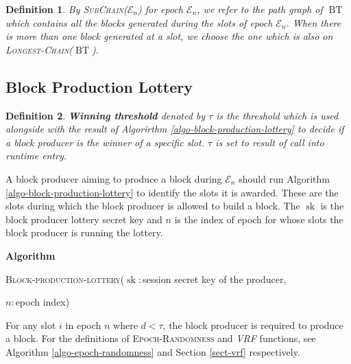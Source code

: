 \documentclass{book}
\newcommand{\tmem}[1]{{\em #1\/}}
\newcommand{\tmname}[1]{\textsc{#1}}
\newcommand{\tmop}[1]{\ensuremath{\operatorname{#1}}}
\newcommand{\tmstrong}[1]{\textbf{#1}}
\newcommand{\tmtextbf}[1]{{\bfseries{#1}}}
\newcommand{\tmtextup}[1]{{\upshape{#1}}}
\newenvironment{tmindent}{\begin{tmparmod}{1.5em}{0pt}{0pt}}{\end{tmparmod}}
\newenvironment{tmparmod}[3]{\begin{list}{}{\setlength{\topsep}{0pt}\setlength{\leftmargin}{#1}\setlength{\rightmargin}{#2}\setlength{\parindent}{#3}\setlength{\listparindent}{\parindent}\setlength{\itemindent}{\parindent}\setlength{\parsep}{\parskip}} \item[]}{\end{list}}
\newcounter{tmcounter}
\newcommand{\custombinding}[1]{%
  \setcounter{tmcounter}{#1}%
  \addtocounter{tmcounter}{-1}%
  \refstepcounter{tmcounter}}
\newtheorem{definition}{Definition}
\newtheorem{definition}{Definition}
\begin{document}
\begin{definition}
  \label{defn-epoch-subchain} By {\tmname{SubChain($\mathcal{E}_n$)}} for
  epoch $\mathcal{E}_n$, we refer to the path graph of $\tmop{BT}$ which
  contains all the blocks generated during the slots of epoch $\mathcal{E}_n$.
  When there is more than one block generated at a slot, we choose the one
  which is also on {\tmname{Longest-Chain($\tmop{BT}$)}}.
\end{definition}

\subsection{Block Production Lottery}

\begin{definition}
  \label{defn-winning-threshold}{\tmstrong{Winning threshold}} denoted by
  {\tmstrong{$\tau$}} is the threshold which is used alongside with the result
  of Algorirthm \ref{algo-block-production-lottery} to decide if a block
  producer is the winner of a specific slot. $\tau$ is set to result of call
  into {} runtime entry.
\end{definition}

A block producer aiming to produce a block during $\mathcal{E}_n$ should run
Algorithm \ref{algo-block-production-lottery} to identify the slots it is
awarded. These are the slots during which the block producer is allowed to
build a block. The $\tmop{sk}$ is the block producer lottery secret key and
$n$ is the index of epoch for whose slots the block producer is running the
lottery.

\custombinding{7}{\noindent}\begin{tmparmod}{0pt}{0pt}{0em}%
    \tmtextbf{Algorithm \tmtextup{7}}{\smallskip}
    
    \begin{tmindent}
      \label{algo-block-production-lottery}{\tmname{Block-production-lottery}}($\tmop{sk}
      :$session secret key of the producer,
      
      $n :$epoch index)
    \end{tmindent}
\end{tmparmod}{\medskip}

For any slot $i$ in epoch $n$ where $d < \tau$, the block producer is required
to produce a block. For the definitions of {\tmname{Epoch-Randomness}} and
{\tmem{{\tmname{VRF}}}} functions, see Algorithm \ref{algo-epoch-randomness}
and Section \ref{sect-vrf} respectively.
\end{document}
